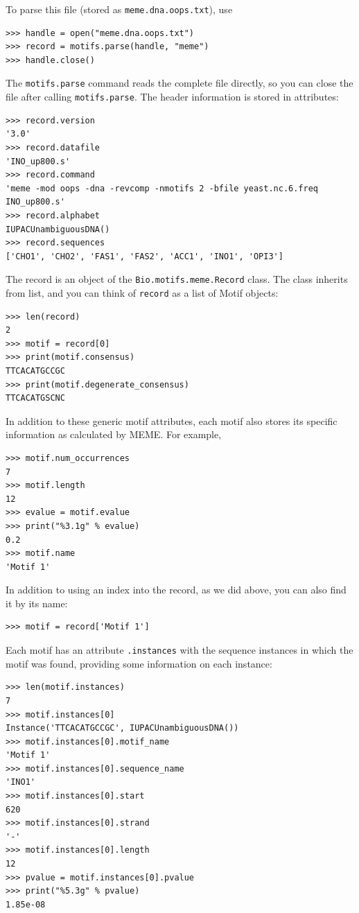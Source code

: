 \documentclass{report}
\begin{document}
To parse this file (stored as \verb+meme.dna.oops.txt+), use
\begin{verbatim}
>>> handle = open("meme.dna.oops.txt")
>>> record = motifs.parse(handle, "meme")
>>> handle.close()
\end{verbatim}
The \verb+motifs.parse+ command reads the complete file directly, so you can
close the file after calling \verb+motifs.parse+.
The header information is stored in attributes:
\begin{verbatim}
>>> record.version
'3.0'
>>> record.datafile
'INO_up800.s'
>>> record.command
'meme -mod oops -dna -revcomp -nmotifs 2 -bfile yeast.nc.6.freq INO_up800.s'
>>> record.alphabet
IUPACUnambiguousDNA()
>>> record.sequences
['CHO1', 'CHO2', 'FAS1', 'FAS2', 'ACC1', 'INO1', 'OPI3']
\end{verbatim}
The record is an object of the \verb+Bio.motifs.meme.Record+ class.
The class inherits from list, and you can think of \verb+record+ as a list of Motif objects:
\begin{verbatim}
>>> len(record)
2
>>> motif = record[0]
>>> print(motif.consensus)
TTCACATGCCGC
>>> print(motif.degenerate_consensus)
TTCACATGSCNC
\end{verbatim}
In addition to these generic motif attributes, each motif also stores its
specific information as calculated by MEME. For example,
\begin{verbatim}
>>> motif.num_occurrences
7
>>> motif.length
12
>>> evalue = motif.evalue
>>> print("%3.1g" % evalue)
0.2
>>> motif.name
'Motif 1'
\end{verbatim}
In addition to using an index into the record, as we did above,
you can also find it by its name:
\begin{verbatim}
>>> motif = record['Motif 1']
\end{verbatim}
Each motif has an attribute \verb+.instances+ with the sequence instances
in which the motif was found, providing some information on each instance:
\begin{verbatim}
>>> len(motif.instances)
7
>>> motif.instances[0]
Instance('TTCACATGCCGC', IUPACUnambiguousDNA())
>>> motif.instances[0].motif_name
'Motif 1'
>>> motif.instances[0].sequence_name
'INO1'
>>> motif.instances[0].start
620
>>> motif.instances[0].strand
'-'
>>> motif.instances[0].length
12
>>> pvalue = motif.instances[0].pvalue
>>> print("%5.3g" % pvalue)
1.85e-08
\end{verbatim}
\end{document}
